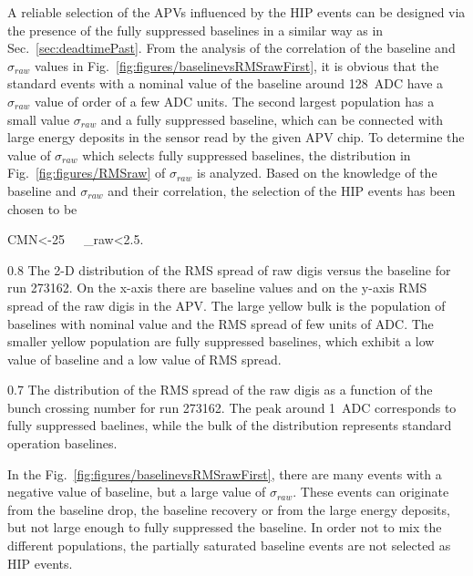 A reliable selection of the APVs influenced by the HIP events can be designed via the presence of the fully suppressed baselines in a similar way as in Sec.~\ref{sec:deadtimePast}. From the analysis of the correlation of the baseline and $\sigma_{raw}$ values in Fig.~\ref{fig:figures/baselinevsRMSrawFirst}, it is obvious that the standard events with a nominal value of the baseline around 128~ADC have a $\sigma_{raw}$ value of order of a few ADC units.  The second largest population has a small value $\sigma_{raw}$ and a fully suppressed baseline, which can be connected with large energy deposits in the sensor read by the given APV chip. To determine the value of $\sigma_{raw}$ which selects fully suppressed baselines, the distribution in Fig.~\ref{fig:figures/RMSraw} of $\sigma_{raw}$ is analyzed. Based on the knowledge of the baseline and $\sigma_{raw}$ and their correlation, the selection of the HIP events has been chosen to be 

{
CMN<-25~~~\sigma_{raw}<2.5.
}


                 {0.8}       %
                 {The 2-D distribution of the RMS spread of raw digis versus the baseline for run 273162. On the x-axis there are baseline values and on the y-axis RMS spread of the raw digis in the APV. The large yellow bulk is the population of baselines with nominal value and the RMS spread of few units of ADC. The smaller yellow population are fully suppressed baselines, which exhibit a low value of baseline and a low value of RMS spread. } %

                 {0.7}       %
                 {The distribution of the RMS spread of the raw digis as a function of the bunch crossing number for run 273162. The peak around 1~ADC corresponds to fully suppressed baelines, while the bulk of the distribution represents standard operation baselines.  } %

In the Fig.~\ref{fig:figures/baselinevsRMSrawFirst}, there are many events with a negative value of baseline, but a large value of $\sigma_{raw}$. These events can originate from the baseline drop, the baseline recovery or from the large energy deposits, but not large enough to fully suppressed the baseline. In order not to mix the different populations, the partially saturated baseline events are not selected as HIP events. 

